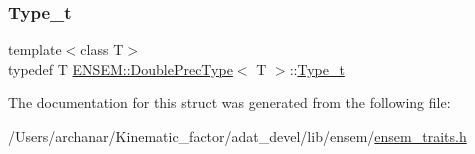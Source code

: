 \subsubsection{\texorpdfstring{Type\_t}{Type\_t}\hspace{0.1cm}{\footnotesize\ttfamily [2/2]}}
{\footnotesize\ttfamily template$<$class T$>$ \\
typedef T \mbox{\hyperlink{structENSEM_1_1DoublePrecType}{E\+N\+S\+E\+M\+::\+Double\+Prec\+Type}}$<$ T $>$\+::\mbox{\hyperlink{structENSEM_1_1DoublePrecType_a3ad79cdc343a0aa27abdd8168287bb65}{Type\+\_\+t}}}



The documentation for this struct was generated from the following file\+:\begin{DoxyCompactItemize}
\item 
/\+Users/archanar/\+Kinematic\+\_\+factor/adat\+\_\+devel/lib/ensem/\mbox{\hyperlink{lib_2ensem_2ensem__traits_8h}{ensem\+\_\+traits.\+h}}\end{DoxyCompactItemize}
